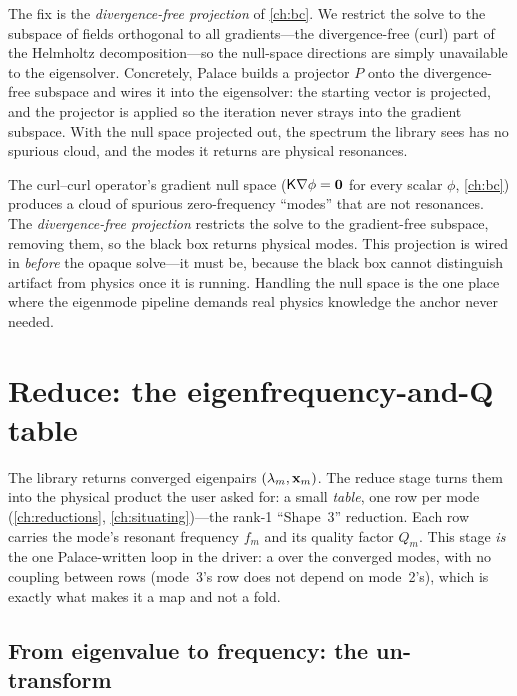 The fix is the \emph{divergence-free projection} of \cref{ch:bc}. We restrict the
solve to the subspace of fields orthogonal to all gradients---the divergence-free
(curl) part of the Helmholtz decomposition---so the null-space directions are
simply unavailable to the eigensolver. Concretely, Palace builds a projector $P$
onto the divergence-free subspace and wires it into the eigensolver: the starting
vector is projected, and the projector is applied so the iteration never strays
into the gradient subspace. With the null space projected out, the spectrum the
library sees has no spurious cloud, and the modes it returns are physical
resonances.

\begin{keyidea}
The curl--curl operator's gradient null space ($\mathsf{K}\nabla\phi=\mathbf 0$ for
every scalar $\phi$, \cref{ch:bc}) produces a cloud of spurious zero-frequency
``modes'' that are not resonances. The \emph{divergence-free projection} restricts
the solve to the gradient-free subspace, removing them, so the black box returns
physical modes. This projection is wired in \emph{before} the opaque solve---it
must be, because the black box cannot distinguish artifact from physics once it
is running. Handling the null space is the one place where the eigenmode pipeline
demands real physics knowledge the anchor never needed.
\end{keyidea}

\section{Reduce: the eigenfrequency-and-Q table}
\label{sec:eig-reduce}

The library returns converged eigenpairs $(\lambda_m,\mathbf{x}_m)$. The reduce stage
turns them into the physical product the user asked for: a small \emph{table},
one row per mode (\cref{ch:reductions}, \cref{ch:situating})---the rank-1
``Shape~3'' reduction. Each row carries the mode's resonant frequency $f_m$ and
its quality factor $Q_m$. This stage \emph{is} the one Palace-written loop in the
driver: a  over the converged modes, with no coupling between rows
(mode~3's row does not depend on mode~2's), which is exactly what makes it a map
and not a fold.

\subsection{From eigenvalue to frequency: the un-transform}

